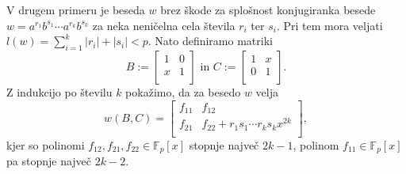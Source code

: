 \begin{dokaz}
        V drugem primeru je beseda $w$ brez škode za splošnost konjugiranka besede $w = a^{r_1}b^{s_1} \cdots a^{r_k}b^{s_k}$ za neka neničelna cela števila $r_i$ ter $s_i$. Pri tem mora veljati $l(w) = \sum_{i = 1}^{k} \lvert r_i \rvert + \lvert s_i \rvert < p$.
        Nato definiramo matriki \begin{equation*}
            B := \begin{bmatrix}
                1 & 0\\
                x & 1\\
             \end{bmatrix} \text{ in } C := \begin{bmatrix}
                1 & x \\
                0 & 1\\
             \end{bmatrix}.
        \end{equation*}  
        Z indukcijo po številu $k$ pokažimo, da za besedo $w$ velja \begin{equation*}
        w(B, C) = \begin{bmatrix}
            f_{11} & f_{12} \\
            f_{21} & f_{22} + r_1s_1 \cdots r_k s_k x^{2k} \\
        \end{bmatrix},
        \end{equation*}  
        kjer so polinomi $f_{12}, f_{21}, f_{22}  \in \mathbb{F}_p[x]$ stopnje največ $2k - 1$, polinom $f_{11} \in \mathbb{F}_p[x]$ pa stopnje največ $2k - 2$.

\end{dokaz}
